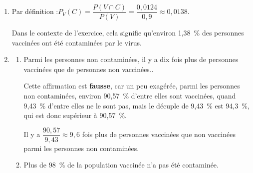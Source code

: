 \begin{enumerate}
\hfill~

\item Par définition :\quad $P_V(C) = \dfrac{P(V \cap C)}{P(V)} = \dfrac{0,0124}{0,9} \approx 0,0138$.

Dans le contexte de l'exercice, cela signifie qu'environ 1,38~\% des personnes vaccinées ont été contaminées par le virus.

\item
	\begin{enumerate}
		\item \og Parmi les personnes non contaminées, il y a dix fois plus de personnes vaccinées que de personnes non vaccinées.\fg{}.

Cette affirmation est \textbf{fausse}, car un peu exagérée, parmi les personnes non contaminées, environ 90,57~\% d'entre elles sont vaccinées, quand 9,43~\% d'entre elles ne le sont pas, mais le décuple de 9,43~\% est 94,3~\%, qui est donc supérieur à 90,57~\%.

Il y a $\dfrac{90,57}{9,43}\approx 9,6$ fois plus de personnes vaccinées que non vaccinées parmi les personnes non contaminées.

		\item \og Plus de 98~\% de la population vaccinée n'a pas été contaminée.\fg{}


\end{enumerate}
\end{enumerate}
